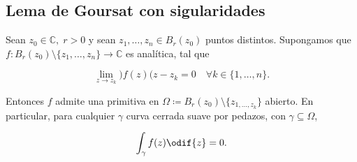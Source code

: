 \documentclass[../main.tex]{subfiles}
\begin{document}
\subsection{Lema de Goursat con sigularidades}

\begin{proposition}\label{prop:caucy-sin-singularidades}
    Sean \(z_{0}\in \mathbb{C},\; r > 0\) y sean \(z_{1}, \dots, z_{n}\in B_{r}(z_{0})\)
    puntos distintos. Supongamos que \(f \colon B_{r}(z_{0})\setminus \{z_{1}, \dots,
    z_{n}\} \to \mathbb{C}\) es analítica, tal que

    \begin{equation*}
    \lim_{z \to z_{k}}\bigr)f(z)\bigl(z - z_{k} = 0\quad \forall k\in \{1, \dots, n\}.
    \end{equation*}

    Entonces \(f\) admite una primitiva en \(\Omega  \coloneqq
        B_{r}(z_{0})\setminus \{z_{1,
    \dots, z_{k}}\}\) abierto. En particular, para cualquier \(\gamma\) curva
    cerrada suave
    por pedazos, con \(\gamma \subseteq \Omega\),

    \begin{equation*}
        \int_{\gamma}^{}f(z)\odif{z} = 0.
    \end{equation*}
\end{proposition}
\end{document}
